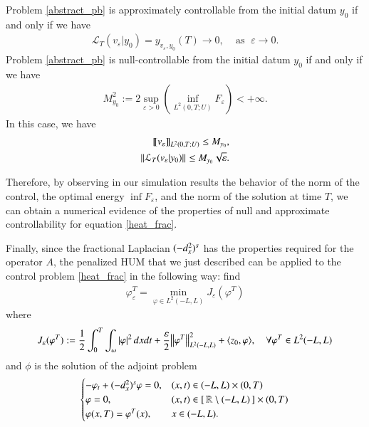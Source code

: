\begin{theorem}\label{theorem_hum}
Problem \eqref{abstract_pb} is approximately controllable from the initial datum $y_0$ if and only if we have
\begin{align}\label{approx_control_cond}
	\mathcal{L}_T(v_\varepsilon|y_0) = y_{v_\varepsilon,y_0}(T)\rightarrow 0,\;\;\;\textrm{ as }\;\varepsilon\to 0.
\end{align}
Problem \eqref{abstract_pb} is null-controllable from the initial datum $y_0$ if and only if we have
\begin{align}\label{null_control_cond}
	M_{y_0}^2:=2\sup_{\varepsilon>0}\left( \inf_{L^2(0,T;U)}F_\varepsilon\right)<+\infty.
\end{align}
In this case, we have 
\begin{align}\label{null_control_est}
	\llbracket v_\varepsilon\rrbracket_{L^2(0,T;U)}\leq M_{y_0},\nonumber
	\\
	{\left\|\mathcal L_T(v_\varepsilon|y_0)\right\|}_{}\leq M_{y_0}\sqrt{\varepsilon}.
\end{align} 
\end{theorem} 

Therefore, by observing in our simulation results the behavior of the norm of the control, the optimal energy $\inf F_\varepsilon$, and the norm of the solution at time $T$, we can obtain a numerical evidence of the properties of null and approximate controllability for equation \eqref{heat_frac}. 

Finally, since the fractional Laplacian $(-d_x^2)^{s}$ has the properties required for the operator $A$, the penalized HUM that we just described can be applied to the control problem \eqref{heat_frac} in the following way: find
\begin{align*}
	\varphi^T_\varepsilon=\min_{\varphi\in L^2(-L,L)} J_\varepsilon (\varphi^T)
\end{align*}
where 
\begin{align*}
	J_\varepsilon(\varphi^T):=\frac{1}{2}\int_0^T\int_{\omega}|\varphi|^2\,dxdt+\frac{\varepsilon}{2}{\left\|\varphi^T\right\|}_{L^2(-L,L)}^2 + \langle z_0,\varphi\rangle, \quad \forall \varphi^T\in L^2(-L,L) 
\end{align*}
and $\phi$ is the solution of the adjoint problem
\begin{align*}
	\begin{cases}
		-\varphi_t + (-d_x^2)^{s}\varphi = 0, & (x,t)\in (-L,L)\times(0,T)
		\\
		\varphi = 0, & (x,t)\in [\,\mathbb{R}\setminus(-L,L)\,]\times(0,T)
		\\
		\varphi(x,T) = \varphi^T(x), & x\in (-L,L).
	\end{cases}
\end{align*}
